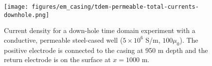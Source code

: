 \begin{figure}
    \begin{center}
    \texttt{[image: figures/em\_casing/tdem-permeable-total-currents-downhole.png]}
    \end{center}
\caption{
    Current density for a down-hole time domain experiment with a conductive, permeable steel-cased well ($5 \times 10^{6}$ S/m, $100\mu_0$).
    The positive electrode is connected to the casing at 950 m depth and the return electrode is on the surface at $x=1000$ m.
}
\label{fig:tdem-permeable-total-currents-downhole}
\end{figure}




